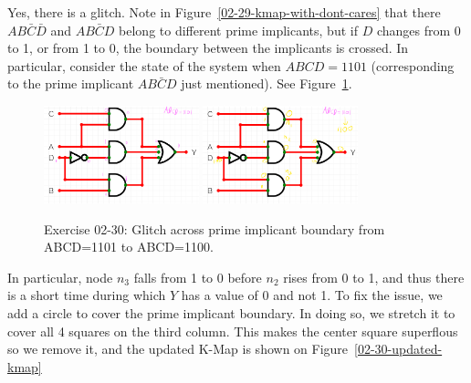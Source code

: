 \documentclass[12pt]{article}
\newenvironment{sol}[1][Solution]{\begin{trivlist}
		\item[\hskip \labelsep {\bfseries #1:}]}{\end{trivlist}}
\begin{document}
\begin{sol}
	Yes, there is a glitch. Note in Figure~\ref{02-29-kmap-with-dont-cares}
	that there $AB\bar{C}\bar{D}$ and $AB\bar{C}D$ belong to different
	prime implicants, but if $D$ changes from 0 to 1, or from 1 to 0, the
	boundary between the implicants is crossed. In particular, consider
	the state of the system when $ABCD=1101$ (corresponding to the prime implicant $AB\bar{C}D$ just mentioned). See Figure~\ref{02-30glitched}.
	
	\begin{figure}
		\centering
		\includegraphics[width=0.4\textwidth]{02-30-preglitch-circuit}
		\includegraphics[width=0.4\textwidth]{02-30-transient-circuit}
		\caption{Exercise 02-30: Glitch across prime implicant boundary from ABCD=1101 to ABCD=1100.}
		\label{02-30glitched}
	\end{figure}
	
	In particular, node $n_3$ falls from 1 to 0 before $n_2$ rises from 0 to 1, 
	and thus there is a short time during which $Y$ has a value of $0$
	and not 1. To fix the issue, we add a circle to cover the prime implicant
	boundary. In doing so, we stretch it to cover all 4 squares on
	the third column. This makes the center square superflous so we remove it, and the updated K-Map is shown on Figure~\ref{02-30-updated-kmap}
	

\end{sol}
\end{document}
